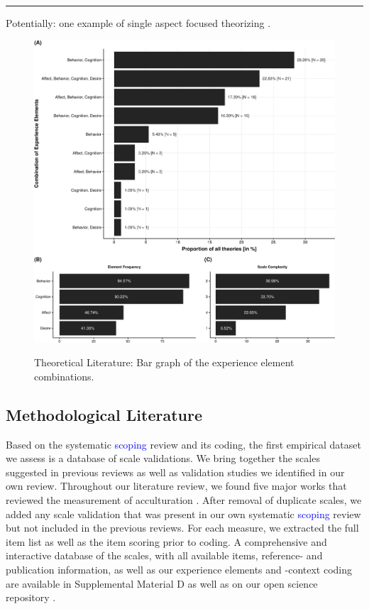 \begin{center}\rule{0.5\linewidth}{0.5pt}\end{center}

Potentially: one example of single aspect focused theorizing
\citep[e.g.][]{Weinreich2009}.

\color{black}

\begin{figure}[h]
\centering
\caption{Theoretical Literature: Bar graph of the experience element combinations.}
\includegraphics[width=\textwidth]{Figures/TheoriesFreq-1}
\label{fig:ElementsTheories}
\end{figure}



\subsection{Methodological Literature}

Based on the systematic \textcolor{blue}{scoping} review and its coding,
the first empirical dataset we assess is a database of scale
validations. We bring together the scales suggested in previous reviews
as well as validation studies we identified in our own review.
Throughout our literature review, we found five major works that
reviewed the measurement of acculturation
\citep{Celenk2011, Maestas2000, Matsudaira2006, Wallace2010, Zane2004}.
After removal of duplicate scales, we added any scale validation that
was present in our own systematic \textcolor{blue}{scoping} review but
not included in the previous reviews. For each measure, we extracted the
full item list as well as the item scoring prior to coding. A
comprehensive and interactive database of the scales, with all available
items, reference- and publication information, as well as our experience
elements and -context coding are available in Supplemental Material D as
well as on our open science repository
\citep[see][]{Kreienkamp2021d, Kreienkamp2021e}.

